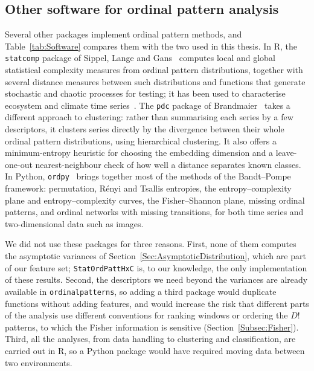 \subsection{Other software for ordinal pattern analysis}\label{Subsec:OtherSoftware}

Several other packages implement ordinal pattern methods, and Table~\ref{tab:Software} compares them with the two used in this thesis. In R, the \texttt{statcomp} package of Sippel, Lange and Gans~\cite{Sippel2016a} computes local and global statistical complexity measures from ordinal pattern distributions, together with several distance measures between such distributions and functions that generate stochastic and chaotic processes for testing; it has been used to characterise ecosystem and climate time series~\cite{Sippel2016}. The \texttt{pdc} package of Brandmaier~\cite{Brandmaier2015} takes a different approach to clustering: rather than summarising each series by a few descriptors, it clusters series directly by the divergence between their whole ordinal pattern distributions, using hierarchical clustering. It also offers a minimum-entropy heuristic for choosing the embedding dimension and a leave-one-out nearest-neighbour check of how well a distance separates known classes. In Python, \texttt{ordpy}~\cite{Pessa2021} brings together most of the methods of the Bandt--Pompe framework: permutation, R\'enyi and Tsallis entropies, the entropy--complexity plane and entropy--complexity curves, the Fisher--Shannon plane, missing ordinal patterns, and ordinal networks with missing transitions, for both time series and two-dimensional data such as images.

We did not use these packages for three reasons. First, none of them computes the asymptotic variances of Section~\ref{Sec:AsymptoticDistribution}, which are part of our feature set; \texttt{StatOrdPattHxC} is, to our knowledge, the only implementation of these results. Second, the descriptors we need beyond the variances are already available in \texttt{ordinalpatterns}, so adding a third package would duplicate functions without adding features, and would increase the risk that different parts of the analysis use different conventions for ranking windows or ordering the $D!$ patterns, to which the Fisher information is sensitive (Section~\ref{Subsec:Fisher}). Third, all the analyses, from data handling to clustering and classification, are carried out in R, so a Python package would have required moving data between two environments.

